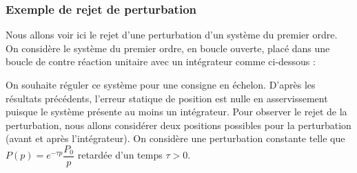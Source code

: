 \subsubsection{Exemple de rejet de perturbation}
Nous allons voir ici le rejet d'une perturbation d'un système du premier ordre. 
On considère le système du premier ordre, en boucle ouverte, placé dans une 
boucle de contre réaction unitaire avec un intégrateur comme ci-dessous :
\begin{center}                           
\end{center}                             
On souhaite réguler ce système pour une consigne en échelon.
D'après les résultats précédents, l'erreur statique de position est nulle 
en asservissement puisque le système présente au moins un intégrateur. 
Pour observer le rejet de la perturbation, nous allons considérer 
deux positions possibles pour la perturbation (avant et après 
l'intégrateur). On considère une perturbation constante telle 
que $P(p)=e^{-\tau p}\dfrac{P_0}{p}$ retardée d'un temps $\tau>0$. 

